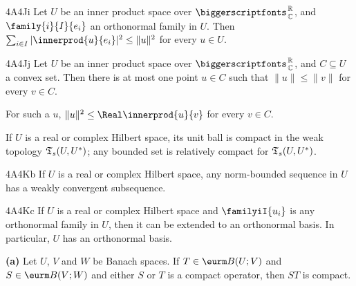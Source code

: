 \spheader 4A4Ji
Let $U$ be an inner product space over $\RoverC$, and
$\family{i}{I}{e_i}$ an orthonormal family in $U$.   Then
$\sum_{i\in I}|\innerprod{u}{e_i}|^2\le\|u\|^2$ for every $u\in U$.

\spheader 4A4Jj Let $U$ be an inner product space over $\RoverC$, and
$C\subseteq U$ a convex set.   Then there is at most one point $u\in C$
such that $\|u\|\le\|v\|$ for every $v\in C$.   

For such a $u$, $\|u\|^2\le\Real\innerprod{u}{v}$ for every $v\in C$.

If $U$ is a real or complex Hilbert space, its unit ball is compact in
the weak topology
$\frak T_s(U,U^*)$;  any bounded set is relatively compact for
$\frak T_s(U,U^*)$.  

\spheader 4A4Kb If $U$ is a real or complex Hilbert space, any
norm-bounded sequence in $U$ has a weakly convergent subsequence.

\spheader 4A4Kc If $U$ is a real or complex Hilbert space and
$\familyiI{u_i}$ is any
orthonormal family in $U$, then it can be extended to an orthonormal
basis.      In particular,
$U$ has an orthonormal basis.

{\bf (a)} Let $U$, $V$ and $W$ be Banach spaces.   If
$T\in\eurm B(U;V)$ and $S\in\eurm B(V;W)$ and either $S$ or $T$ is a
compact operator, then $ST$ is compact.

